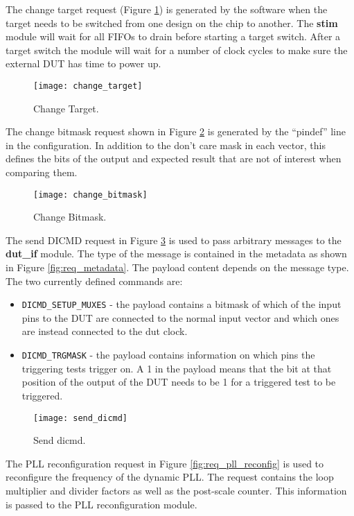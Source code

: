 The change target request (Figure \ref{fig:req_change_target}) is generated by the software when the target needs to be switched
from one design on the chip to another. The \textbf{stim} module will wait for all FIFOs to drain before starting a target switch.
After a target switch the module will wait for a number of clock cycles to make sure the external DUT has time to power up.

\begin{figure}[h]
 \centering
 \texttt{[image: change\_target]}
 \caption{Change Target.}
 \label{fig:req_change_target}
\end{figure}


The change bitmask request shown in Figure \ref{fig:req_change_bitmask} is generated by the ``pindef'' line in the configuration.
In addition to the don't care mask in each vector, this defines the bits of the output and expected result that are not of
interest when comparing them.

\begin{figure}[h]
 \centering
 \texttt{[image: change\_bitmask]}
 \caption{Change Bitmask.}
 \label{fig:req_change_bitmask}
\end{figure}


The send DICMD request in Figure \ref{fig:req_send_dicmd} is used to pass arbitrary messages to the \textbf{dut\_if} module. The
type of the message is contained in the metadata as shown in Figure \ref{fig:req_metadata}. The payload content depends on the
message type. The two currently defined commands are:
\begin{itemize}
 \item \texttt{DICMD\_SETUP\_MUXES} - the payload contains a bitmask of which of the input pins to the DUT are connected to the normal
input vector and which ones are instead connected to the dut clock.
 \item \texttt{DICMD\_TRGMASK} - the payload contains information on which pins the triggering tests trigger on. A 1 in the payload means that the bit at that
position of the output of the DUT needs to be 1 for a triggered test to be triggered.
\end{itemize}

\begin{figure}[h]
 \centering
 \texttt{[image: send\_dicmd]}
 \caption{Send dicmd.}
 \label{fig:req_send_dicmd}
\end{figure}


The PLL reconfiguration request in Figure \ref{fig:req_pll_reconfig} is used to reconfigure the frequency
of the dynamic PLL. The request contains the loop multiplier and divider factors as well as the
post-scale counter. This information is passed to the PLL reconfiguration module.

